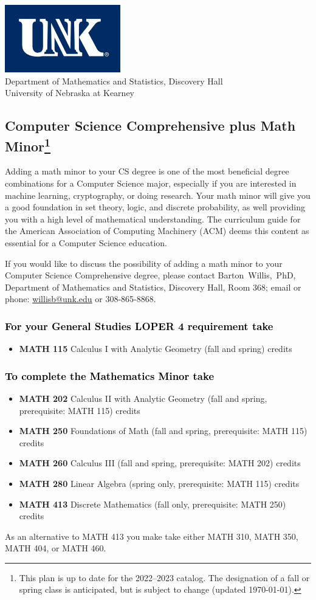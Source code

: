 \documentclass[10pt]{article}
\makeatletter
\newenvironment{mypar}[2]
   {\begin{list}{}%
     {\setlength\leftmargin{#1}
     \setlength\rightmargin{#2}}
     \item[]}
   {\end{list}}
\newcommand{\calcone}{\textbf{MATH 115} Calculus I with Analytic Geometry (fall and spring) \dotfill 5 credits}
\newcommand{\calctwo}{\textbf{MATH 202} Calculus II with Analytic Geometry (fall and spring, prerequisite: MATH 115) \dotfill 5 credits }
\newcommand{\foundations}{\textbf{MATH 250} Foundations of Math (fall and spring, prerequisite: MATH 115)  \dotfill 3 credits}
\newcommand{\calcthree}{\textbf{MATH 260} Calculus III  (fall and spring, prerequisite: MATH 202) \dotfill 5 credits}
\newcommand{\linear}{\textbf{MATH 280} Linear Algebra (spring only, prerequisite: MATH 115) \dotfill 3 credits}
\newcommand{\discrete}{\textbf{MATH 413} Discrete Mathematics  (fall only, prerequisite: MATH 250)\dotfill 3 credits}
\newcommand{\discreteshort}{MATH 413}
\newcommand{\abstractalgebrashort}{MATH 350}
\newcommand{\advancedcalcshort}{MATH 460}
\newcommand{\collegegeometryshort}{MATH 310}
\newcommand{\numbertheoryshort}{MATH 404}
\newcommand{\contactbw}{\mbox{Barton Willis, PhD}, Department of Mathematics and Statistics,  Discovery Hall, Room 368;
email or phone: \href{mailto:willisb@unk.edu}{willisb@unk.edu} or 308-865-8868.}
\newcommand{\forinfo}[2]{If you would like to discuss the possibility of adding a math {#1} to your {#2}, please contact \contactbw}
\newcommand{\catalog}{2022--2023 }
\newcommand{\myfootnote}{\footnote{This plan is up to date for  the \catalog catalog. The designation of a fall or spring class is 
anticipated, but  is subject to change (updated  \today).}}
\newcommand{\myheading}{
\begin{flushleft}
\includegraphics[scale=0.35]{unk-logo}\\
\setcounter{footnote}{0}
\vspace{0.25in}
 \textcolor{unkblue}{Department of Mathematics and Statistics, Discovery Hall} \\
  \textcolor{unkblue}{University of Nebraska at Kearney}
\end{flushleft}}
\makeatother
\begin{document}
\myheading


\subsection*{\textbf{\textcolor{unkblue}{Computer Science Comprehensive plus Math Minor\myfootnote}}}


Adding a math minor to your CS degree is one of the most beneficial degree 
combinations for a Computer Science major, especially if you are interested 
in machine learning, cryptography,  or doing research.  Your math minor will 
give you a good foundation in set theory, logic, and discrete probability, 
as well providing you with a high level of mathematical understanding. 
The curriculum guide for the American Association of Computing Machinery (ACM) 
deems  this content  as essential for  a Computer Science education.

\forinfo{minor}{Computer Science Comprehensive degree}

\vspace{-0.1in}

\subsubsection*{\textcolor{black}{For  your General Studies LOPER 4 requirement take}}
\begin{itemize}
\item  \calcone
\end{itemize}

\subsubsection*{\textcolor{black}{To complete the Mathematics Minor  take}}
\begin{itemize}
\item \calctwo
\item \foundations
\item \calcthree
\item \linear
\item \discrete
\end{itemize}
\vspace{-0.1in}
\begin{mypar}{0.5cm}{0.5cm}
As an alternative to  \discreteshort{} you make take either 
\collegegeometryshort, \abstractalgebrashort, \numbertheoryshort, or \advancedcalcshort.
\end{mypar}

\vspace{-0.1in}
\end{document}
